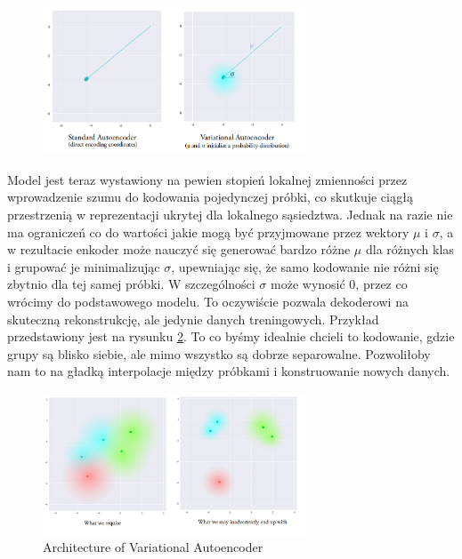 \begin{figure}[h!]
    \centering
    \includegraphics[width=0.7\textwidth]{images/vae_vs_stand}
    \caption{}
    \label{fig:vae_vs_stand}
\end{figure}

Model jest teraz wystawiony na pewien stopień lokalnej zmienności przez wprowadzenie szumu do kodowania pojedynczej próbki, co skutkuje ciągłą przestrzenią w reprezentacji ukrytej dla lokalnego sąsiedztwa. Jednak na razie nie ma ograniczeń co do wartości jakie mogą być przyjmowane przez wektory $\mu$ i $\sigma$, a w rezultacie enkoder może nauczyć się generować bardzo różne $\mu$ dla różnych klas i grupować je minimalizując $\sigma$, upewniając się, że samo kodowanie nie różni się zbytnio dla tej samej próbki. W szczególności $\sigma$ może wynosić 0, przez co wrócimy do podstawowego modelu. To oczywiście pozwala dekoderowi na skuteczną rekonstrukcję, ale jedynie danych treningowych. Przykład przedstawiony jest na rysunku \ref{fig:vae_nolimits}. To co byśmy idealnie chcieli to kodowanie, gdzie grupy są blisko siebie, ale mimo wszystko są dobrze separowalne. Pozwoliłoby nam to na gładką interpolacje między próbkami i konstruowanie nowych danych.

\begin{figure}[h!]
    \centering
    \includegraphics[width=0.7\textwidth]{images/vae_nolimits}
    \caption{Architecture of Variational Autoencoder}
    \label{fig:vae_nolimits}
\end{figure}

